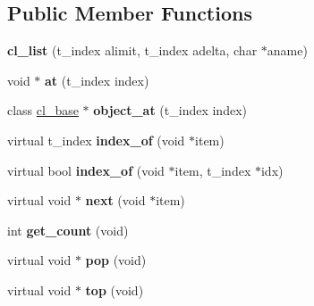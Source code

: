 \subsection*{Public Member Functions}
\begin{DoxyCompactItemize}
\item 
\hypertarget{classcl__list_a85d92f26e22d8ad00416ad7e26e85409}{
{\bfseries cl\_\-list} (t\_\-index alimit, t\_\-index adelta, char $\ast$aname)}
\label{classcl__list_a85d92f26e22d8ad00416ad7e26e85409}

\item 
\hypertarget{classcl__list_ac7d6177ed937048bfd5fc673b618d89a}{
void $\ast$ {\bfseries at} (t\_\-index index)}
\label{classcl__list_ac7d6177ed937048bfd5fc673b618d89a}

\item 
\hypertarget{classcl__list_a750c847d848f93c55acebb27336bde32}{
class \hyperlink{classcl__base}{cl\_\-base} $\ast$ {\bfseries object\_\-at} (t\_\-index index)}
\label{classcl__list_a750c847d848f93c55acebb27336bde32}

\item 
\hypertarget{classcl__list_a2e410f26d12453d1699ea2c808e506b7}{
virtual t\_\-index {\bfseries index\_\-of} (void $\ast$item)}
\label{classcl__list_a2e410f26d12453d1699ea2c808e506b7}

\item 
\hypertarget{classcl__list_a7eae53736d6028803aaf2fea5188d1e5}{
virtual bool {\bfseries index\_\-of} (void $\ast$item, t\_\-index $\ast$idx)}
\label{classcl__list_a7eae53736d6028803aaf2fea5188d1e5}

\item 
\hypertarget{classcl__list_aef0456132d8b16abbb82ea88d272ddb7}{
virtual void $\ast$ {\bfseries next} (void $\ast$item)}
\label{classcl__list_aef0456132d8b16abbb82ea88d272ddb7}

\item 
\hypertarget{classcl__list_a538c92d61f98cc76d751bff1b9464a97}{
int {\bfseries get\_\-count} (void)}
\label{classcl__list_a538c92d61f98cc76d751bff1b9464a97}

\item 
\hypertarget{classcl__list_a1e67e4531eecd5f51673f9c6d1ada13a}{
virtual void $\ast$ {\bfseries pop} (void)}
\label{classcl__list_a1e67e4531eecd5f51673f9c6d1ada13a}

\item 
\hypertarget{classcl__list_ae5518c248f803c95a9395e205f4bbc5e}{
virtual void $\ast$ {\bfseries top} (void)}
\label{classcl__list_ae5518c248f803c95a9395e205f4bbc5e}


\end{DoxyCompactItemize}
